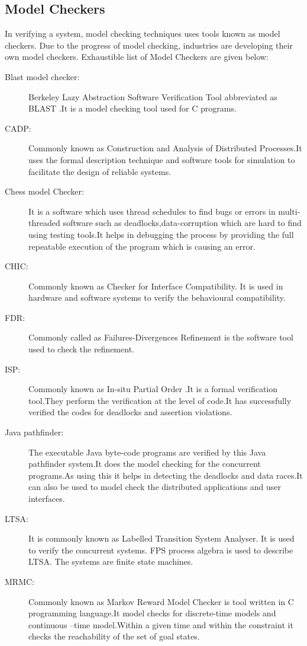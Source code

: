 \documentclass[a4paper,12pt]{extarticle}
\begin{document}
\subsection{Model Checkers}
In verifying a system, model checking techniques uses tools known as model checkers. Due to the progress of model checking, industries are developing their own model checkers. 
Exhaustible list of  Model Checkers are given below:
\begin{description}
\item[Blast model checker:]Berkeley Lazy Abstraction Software Verification Tool abbreviated as BLAST .It is a model checking tool used for C programs.
\item[CADP:]Commonly known as  Construction and Analysis of Distributed Processes.It uses the formal description technique and software tools for simulation to facilitate the design of reliable systems.
\item[Chess model Checker:]It is a software which uses thread schedules to find bugs or errors in multi-threaded software such as deadlocks,data-corruption which are hard to find using testing tools.It helps in debugging the process by providing the full repeatable execution of the program which is causing an error.
\item[CHIC:] Commonly known as Checker for Interface Compatibility. It is used in hardware and software systems to verify the behavioural compatibility.
\item[FDR:] Commonly called as Failures-Divergences Refinement is the software tool used to check  the refinement.
\item[ISP:] Commonly known as In-situ Partial Order .It is a formal verification tool.They perform the verification at the level of code.It has successfully verified the codes for deadlocks and assertion violations.
\item[Java pathfinder:]The executable Java byte-code programs are verified by this Java pathfinder system.It does the model checking for the concurrent programs.As using this it helps in detecting the deadlocks and data races.It can also be used to model check the distributed applications and user interfaces.
\item[LTSA:] It is commonly known as Labelled Transition System Analyser. It is used to verify the concurrent systems. FPS process algebra is used to describe LTSA. The systems are finite state machines.
\item[MRMC:] Commonly known as Markov Reward Model Checker is tool written in C programming language.It model checks for discrete-time models and continuous –time model.Within a given time and within the constraint it checks the reachability of the set of goal states.

\end{description}
\end{document}

